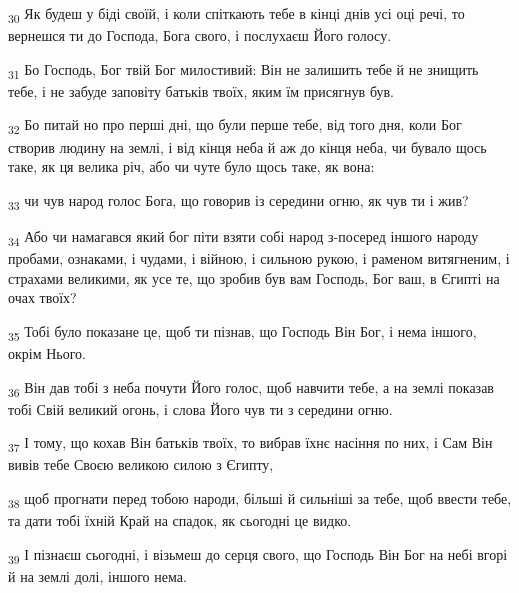 \begin{tcolorbox}
\textsubscript{30} Як будеш у біді своїй, і коли спіткають тебе в кінці днів усі оці речі, то вернешся ти до Господа, Бога свого, і послухаєш Його голосу.
\end{tcolorbox}
\begin{tcolorbox}
\textsubscript{31} Бо Господь, Бог твій Бог милостивий: Він не залишить тебе й не знищить тебе, і не забуде заповіту батьків твоїх, яким їм присягнув був.
\end{tcolorbox}
\begin{tcolorbox}
\textsubscript{32} Бо питай но про перші дні, що були перше тебе, від того дня, коли Бог створив людину на землі, і від кінця неба й аж до кінця неба, чи бувало щось таке, як ця велика річ, або чи чуте було щось таке, як вона:
\end{tcolorbox}
\begin{tcolorbox}
\textsubscript{33} чи чув народ голос Бога, що говорив із середини огню, як чув ти і жив?
\end{tcolorbox}
\begin{tcolorbox}
\textsubscript{34} Або чи намагався який бог піти взяти собі народ з-посеред іншого народу пробами, ознаками, і чудами, і війною, і сильною рукою, і раменом витягненим, і страхами великими, як усе те, що зробив був вам Господь, Бог ваш, в Єгипті на очах твоїх?
\end{tcolorbox}
\begin{tcolorbox}
\textsubscript{35} Тобі було показане це, щоб ти пізнав, що Господь Він Бог, і нема іншого, окрім Нього.
\end{tcolorbox}
\begin{tcolorbox}
\textsubscript{36} Він дав тобі з неба почути Його голос, щоб навчити тебе, а на землі показав тобі Свій великий огонь, і слова Його чув ти з середини огню.
\end{tcolorbox}
\begin{tcolorbox}
\textsubscript{37} І тому, що кохав Він батьків твоїх, то вибрав їхнє насіння по них, і Сам Він вивів тебе Своєю великою силою з Єгипту,
\end{tcolorbox}
\begin{tcolorbox}
\textsubscript{38} щоб прогнати перед тобою народи, більші й сильніші за тебе, щоб ввести тебе, та дати тобі їхній Край на спадок, як сьогодні це видко.
\end{tcolorbox}
\begin{tcolorbox}
\textsubscript{39} І пізнаєш сьогодні, і візьмеш до серця свого, що Господь Він Бог на небі вгорі й на землі долі, іншого нема.
\end{tcolorbox}
